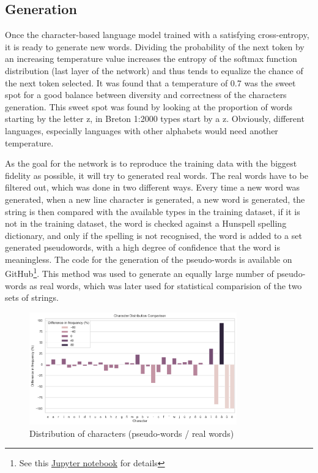     \subsection{Generation}
Once the character-based language model trained with a satisfying cross-entropy, it is ready to generate new words. Dividing the probability of the next token by an increasing temperature value increases the entropy of the softmax function distribution (last layer of the network) and thus tends to equalize the chance of the next token selected. It was found that a temperature of 0.7 was the sweet spot for a good balance between diversity and correctness of the characters generation. This sweet spot was found by looking at the proportion of words starting by the letter z, in Breton 1:2000 types start by a z. Obviously, different languages, especially languages with other alphabets would need another temperature.

As the goal for the network is to reproduce the training data with the biggest fidelity as possible, it will try to generated real words. The real words have to be filtered out, which was done in two different ways. Every time a new word was generated, when a new line character is generated, a new word is generated, the string is then compared with the available types in the training dataset, if it is not in the training dataset, the word is checked against a Hunspell spelling dictionary, and only if the spelling is not recognised, the word is added to a set generated pseudowords, with a high degree of confidence that the word is meaningless. The code for the generation of the pseudo-words is available on GitHub\footnote{See this \href{https://github.com/Oktogazh/sudogen/blob/master/2\%20Training.ipynb}{Jupyter notebook} for details}. This method was used to generate an equally large number of pseudo-words as real words, which was later used for statistical comparision of the two sets of strings.

\begin{figure}[htbp]
    \centering
    \includegraphics[width=0.8\textwidth]{figures/chars.png}
    \caption{Distribution of characters (pseudo-words / real words)}
\end{figure}\label{fig:chars}

